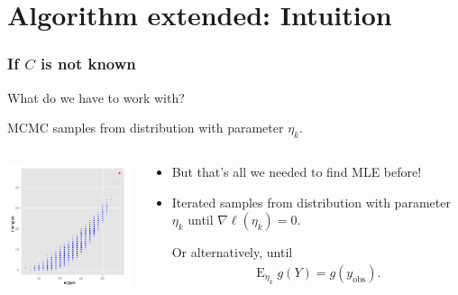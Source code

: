\documentclass[ 10pt]{beamer}
\DeclareMathOperator{\E}{E}
\newcommand{\etaLCM}{\hat{\eta}_{\textrm{LCM}}}
\newcommand{\yobs}{y_{\text{obs}}}
\begin{document}
\section{Algorithm extended: Intuition}
\frame
{
\frametitle{If $C$ is not known}
What do we have to work with?
\vspace{4mm}

\pause
MCMC samples from distribution with parameter $\eta_k$.  

\vspace{1ex}

\begin{columns}[t]
\begin{column}[T]{0.39\textwidth}
\includegraphics[width=2in]{MCsample-bare}
\end{column}

\begin{column}[r]{0.61\textwidth}
\pause

\begin{itemize}
\item But that's all we needed to find MLE before! 
\vspace{1mm}


\item Iterated samples from distribution with parameter $\eta_k$ until $\nabla \ell(\eta_k) = 0$.
\vspace{2mm}

Or alternatively, until
\begin{align*}
	\E_{\eta_k} g(Y) = g(\yobs).
\end{align*}

\end{itemize}
\end{column}
\end{columns}
}
\end{document}

